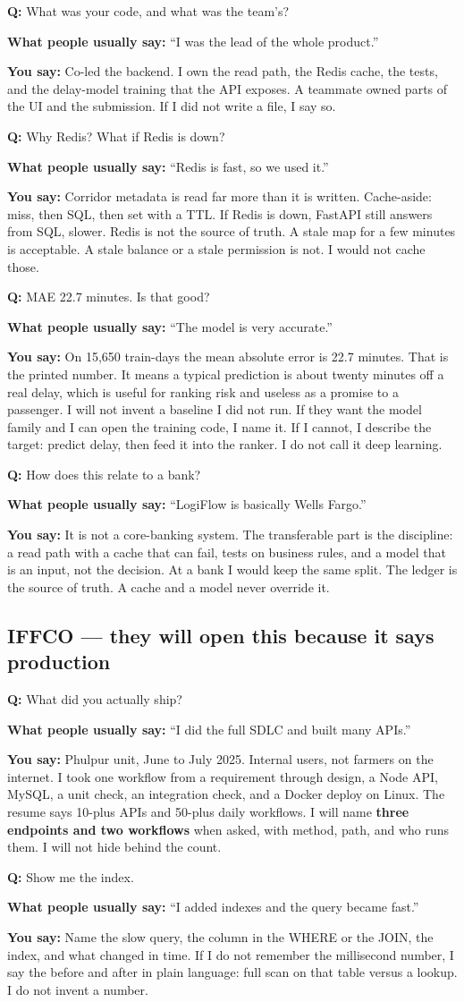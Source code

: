 \documentclass[a4paper,9.5pt]{extarticle}
\newcommand{\Q}[1]{\par\vspace{1.5pt}\noindent\textcolor{hot}{\textbf{Q:} #1}\par}
\newcommand{\Typ}[1]{\noindent\textcolor{muted}{\textbf{What people usually say:} #1}\par}
\newcommand{\Say}[1]{\noindent\textcolor{ok}{\textbf{You say:} #1}\par}
\begin{document}
\Q{What was your code, and what was the team's?}
\Typ{``I was the lead of the whole product.''}
\Say{Co-led the backend. I own the read path, the Redis cache, the tests, and the delay-model training that the API exposes. A teammate owned parts of the UI and the submission. If I did not write a file, I say so.}

\Q{Why Redis? What if Redis is down?}
\Typ{``Redis is fast, so we used it.''}
\Say{Corridor metadata is read far more than it is written. Cache-aside: miss, then SQL, then set with a TTL. If Redis is down, FastAPI still answers from SQL, slower. Redis is not the source of truth. A stale map for a few minutes is acceptable. A stale balance or a stale permission is not. I would not cache those.}

\Q{MAE 22.7 minutes. Is that good?}
\Typ{``The model is very accurate.''}
\Say{On 15{,}650 train-days the mean absolute error is 22.7 minutes. That is the printed number. It means a typical prediction is about twenty minutes off a real delay, which is useful for ranking risk and useless as a promise to a passenger. I will not invent a baseline I did not run. If they want the model family and I can open the training code, I name it. If I cannot, I describe the target: predict delay, then feed it into the ranker. I do not call it deep learning.}

\Q{How does this relate to a bank?}
\Typ{``LogiFlow is basically Wells Fargo.''}
\Say{It is not a core-banking system. The transferable part is the discipline: a read path with a cache that can fail, tests on business rules, and a model that is an input, not the decision. At a bank I would keep the same split. The ledger is the source of truth. A cache and a model never override it.}

\subsection{IFFCO --- they will open this because it says production}
\Q{What did you actually ship?}
\Typ{``I did the full SDLC and built many APIs.''}
\Say{Phulpur unit, June to July 2025. Internal users, not farmers on the internet. I took one workflow from a requirement through design, a Node API, MySQL, a unit check, an integration check, and a Docker deploy on Linux. The resume says 10-plus APIs and 50-plus daily workflows. I will name \textbf{three endpoints and two workflows} when asked, with method, path, and who runs them. I will not hide behind the count.}

\Q{Show me the index.}
\Typ{``I added indexes and the query became fast.''}
\Say{Name the slow query, the column in the WHERE or the JOIN, the index, and what changed in time. If I do not remember the millisecond number, I say the before and after in plain language: full scan on that table versus a lookup. I do not invent a number.}
\end{document}
